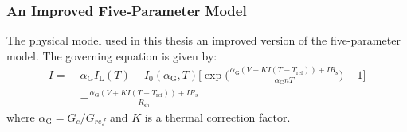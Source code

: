 \begin{frame}
    \frametitle{An Improved Five-Parameter Model}
    The physical model used in this thesis an improved version of the five-parameter model. The governing equation is given by:
    \small
    \begin{align}
        I = \; &\alpha_{\text{G}}I_{\text{L}}(T) - I_{0}(\alpha_{\text{G}}, T)\Biggl[\exp\biggl(\frac{\alpha_{\text{G}}(V + KI(T - T_{\text{ref}}))+IR_{\text{s}}}{\alpha_{\text{G}}nT}\biggr) - 1\Biggr] \nonumber \\
                        &- \frac{\alpha_{\text{G}}(V + KI(T - T_{\text{ref}}))+IR_{\text{s}}}{R_{\text{sh}}} \nonumber
    \end{align}
    \normalsize
    where \(\alpha_{\text{G}} = G_{c} / G_{ref}\) and \(K\) is a thermal correction factor.
\end{frame}
